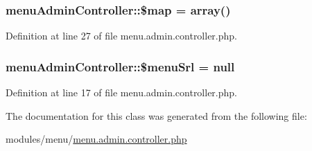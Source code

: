 \hypertarget{classmenuAdminController_a9f7e4b726de0df35fa25694c702f88f8}{
\subsubsection[{\$map}]{\setlength{\rightskip}{0pt plus 5cm}menu\-Admin\-Controller\-::\$map = array()}}\label{classmenuAdminController_a9f7e4b726de0df35fa25694c702f88f8}


Definition at line 27 of file menu.\-admin.\-controller.\-php.

\hypertarget{classmenuAdminController_a13934ce3c67b5b27f0d35704e98cc033}{
\subsubsection[{\$menu\-Srl}]{\setlength{\rightskip}{0pt plus 5cm}menu\-Admin\-Controller\-::\$menu\-Srl = null}}\label{classmenuAdminController_a13934ce3c67b5b27f0d35704e98cc033}


Definition at line 17 of file menu.\-admin.\-controller.\-php.



The documentation for this class was generated from the following file\-:\begin{DoxyCompactItemize}
\item 
modules/menu/\hyperlink{menu_8admin_8controller_8php}{menu.\-admin.\-controller.\-php}\end{DoxyCompactItemize}
